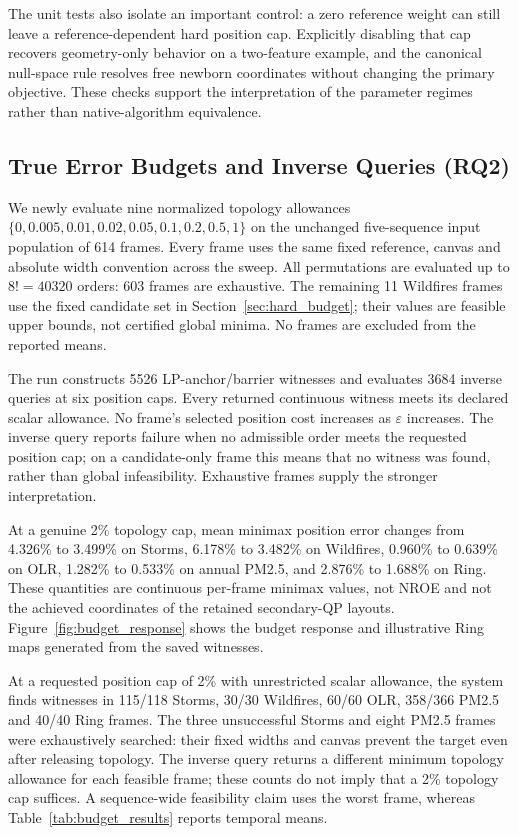 The unit tests also isolate an important control: a zero reference weight can still leave a reference-dependent hard position cap. Explicitly disabling that cap recovers geometry-only behavior on a two-feature example, and the canonical null-space rule resolves free newborn coordinates without changing the primary objective. These checks support the interpretation of the parameter regimes rather than native-algorithm equivalence.




\subsection{True Error Budgets and Inverse Queries (RQ2)}\label{sec:budget_experiments}
We newly evaluate nine normalized topology allowances $\{0,0.005,0.01,0.02,0.05,0.1,0.2,0.5,1\}$ on the unchanged five-sequence input population of 614 frames. Every frame uses the same fixed reference, canvas and absolute width convention across the sweep. All permutations are evaluated up to $8!=40320$ orders: 603 frames are exhaustive. The remaining 11 Wildfires frames use the fixed candidate set in Section~\ref{sec:hard_budget}; their values are feasible upper bounds, not certified global minima. No frames are excluded from the reported means.

The run constructs 5526 LP-anchor/barrier witnesses and evaluates 3684 inverse queries at six position caps. Every returned continuous witness meets its declared scalar allowance. No frame's selected position cost increases as $\varepsilon$ increases. The inverse query reports failure when no admissible order meets the requested position cap; on a candidate-only frame this means that no witness was found, rather than global infeasibility. Exhaustive frames supply the stronger interpretation.


At a genuine 2\% topology cap, mean minimax position error changes from 4.326\% to 3.499\% on Storms, 6.178\% to 3.482\% on Wildfires, 0.960\% to 0.639\% on OLR, 1.282\% to 0.533\% on annual PM2.5, and 2.876\% to 1.688\% on Ring. These quantities are continuous per-frame minimax values, not NROE and not the achieved coordinates of the retained secondary-QP layouts. Figure~\ref{fig:budget_response} shows the budget response and illustrative Ring maps generated from the saved witnesses.

At a requested position cap of 2\% with unrestricted scalar allowance, the system finds witnesses in 115/118 Storms, 30/30 Wildfires, 60/60 OLR, 358/366 PM2.5 and 40/40 Ring frames. The three unsuccessful Storms and eight PM2.5 frames were exhaustively searched: their fixed widths and canvas prevent the target even after releasing topology. The inverse query returns a different minimum topology allowance for each feasible frame; these counts do not imply that a 2\% topology cap suffices. A sequence-wide feasibility claim uses the worst frame, whereas Table~\ref{tab:budget_results} reports temporal means.

